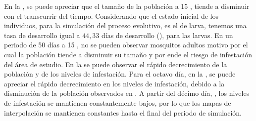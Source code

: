 En la , se puede apreciar que el tamaño de la población a 15
\textcelsius, tiende a disminuir con el transcurrir del tiempo. Considerando que el estado inicial
de los individuos, para la simulación del proceso evolutivo, es el de larva, tenemos una tasa de
desarrollo igual a $44,33$ días de desarrollo
(), para las larvas. En un periodo de 50
días a 15 \textcelsius, no se pueden observar mosquitos adultos motivo por el cual la población
tiende a disminuir su tamaño y por ende el riesgo de infestación del área de estudio. En la
 se puede observar el rápido decrecimiento de la población y de
los niveles de infestación. Para el octavo día, en la , se
puede apreciar el rápido decrecimiento en los niveles de infestación, debido a la disminución de
la población observados en . A partir del décimo día,
, los niveles de infestación se mantienen constantemente
bajos, por lo que los mapas de interpolación se mantienen constantes hasta el final del periodo de
simulación.

